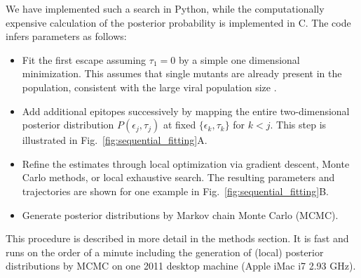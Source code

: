 \documentclass{frontiers}
\newcommand{\FIG}[1]{Fig.~\ref{fig:#1}}
\newcommand{\fcoeff}{\epsilon}
\begin{document}
We have implemented such a search in Python, while the computationally expensive
calculation of the posterior probability is implemented in C. The code infers
parameters as follows:
\begin{itemize}
  \item Fit the first escape assuming $\tau_1=0$ by a
  simple one dimensional minimization. This assumes that single mutants
  are already present in the population, consistent with the large viral population
  size \citep{coffin_hiv_1995,perelson_dynamics_1997}.
  \item Add additional epitopes successively by mapping the entire two-dimensional
  posterior distribution $P(\fcoeff_j,\tau_j)$ at fixed $\{\fcoeff_k,\tau_k\}$
  for $k<j$. This step is illustrated in \FIG{sequential_fitting}A.
  \item Refine the estimates through local optimization via gradient descent, Monte
  Carlo methods, or local exhaustive search. The resulting parameters and
  trajectories are shown for one example in \FIG{sequential_fitting}B.
  \item Generate posterior distributions by Markov chain Monte Carlo (MCMC). 
\end{itemize}

This procedure is described in more detail in the methods section. It is fast and
runs on the order of a minute including the generation of (local) posterior
distributions by MCMC on one 2011 desktop machine (Apple iMac i7 2.93 GHz).
\end{document}
